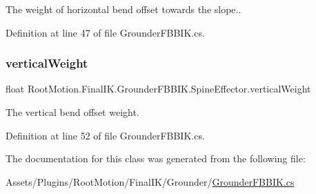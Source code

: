The weight of horizontal bend offset towards the slope.. 



Definition at line 47 of file Grounder\+F\+B\+B\+I\+K.\+cs.

\mbox{\label{class_root_motion_1_1_final_i_k_1_1_grounder_f_b_b_i_k_1_1_spine_effector_a336abbd5c8531f2a6b02d1dd3f6ac63b}} 
\subsubsection{\texorpdfstring{vertical\+Weight}{verticalWeight}}
{\footnotesize\ttfamily float Root\+Motion.\+Final\+I\+K.\+Grounder\+F\+B\+B\+I\+K.\+Spine\+Effector.\+vertical\+Weight}



The vertical bend offset weight. 



Definition at line 52 of file Grounder\+F\+B\+B\+I\+K.\+cs.



The documentation for this class was generated from the following file\+:\begin{DoxyCompactItemize}
\item 
Assets/\+Plugins/\+Root\+Motion/\+Final\+I\+K/\+Grounder/\mbox{\hyperlink{_grounder_f_b_b_i_k_8cs}{Grounder\+F\+B\+B\+I\+K.\+cs}}\end{DoxyCompactItemize}
